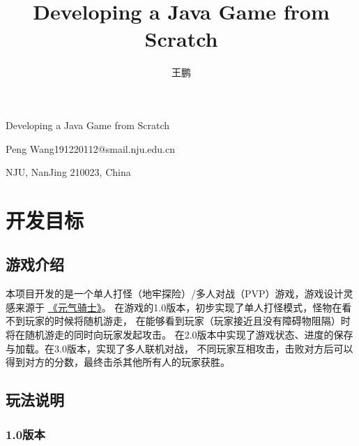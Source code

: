 \documentclass{SCIS2022cn}
\begin{document}

\title{Developing a Java Game from Scratch}{Developing a Java Game from Scratch}

\author[1]{王鹏}{Peng Wang}{{191220112@smail.nju.edu.cn}}

\address[1]{南京大学, 南京 210023}{NJU, NanJing {\rm 210023}, China}



\maketitle

\section{开发目标}

\subsection{游戏介绍}

本项目开发的是一个单人打怪（地牢探险）/多人对战（PVP）游戏，游戏设计灵感来源于
\href{http://www.chillyroom.com/zh/soul-knight/change-log}{《元气骑士》}。
在游戏的1.0版本，初步实现了单人打怪模式，怪物在看不到玩家的时候将随机游走，
在能够看到玩家（玩家接近且没有障碍物阻隔）时将在随机游走的同时向玩家发起攻击。
在2.0版本中实现了游戏状态、进度的保存与加载。在3.0版本，实现了多人联机对战，
不同玩家互相攻击，击败对方后可以得到对方的分数，最终击杀其他所有人的玩家获胜。

\subsection{玩法说明}

\subsubsection{1.0版本}
\end{document}
